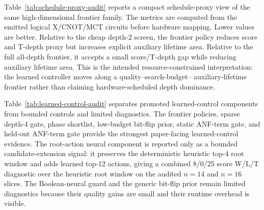 \documentclass[11pt]{article}
\newcommand{\mct}{\ensuremath{\mathrm{MCT}}}
\begin{document}
\begin{table}[H]
\centering
\scriptsize
\caption{Stage-gated depth-frontier controller.  The depth-4 trigger is chosen
on validation data and applied unchanged to scale and truth-bridge rows.}
\label{tab:stage-frontier}

\end{table}

Table~\ref{tab:schedule-proxy-audit} reports a compact schedule-proxy view of
the same high-dimensional frontier family.  The metrics are computed from the
emitted logical X/CNOT/\mct{} circuits before hardware mapping.  Lower values
are better.  Relative to the cheap depth-2 screen, the frontier policy reduces
score and T-depth proxy but increases explicit auxiliary lifetime area.  Relative
to the full all-depth frontier, it accepts a small score/T-depth gap while
reducing auxiliary lifetime area.  This is the intended resource-constrained
interpretation: the learned controller moves along a quality--search-budget--
auxiliary-lifetime frontier rather than claiming hardware-scheduled depth
dominance.

\begin{table}[H]
\centering
\scriptsize
\setlength{\tabcolsep}{2pt}
\renewcommand{\arraystretch}{1.05}
\caption{Logic-level schedule-proxy audit.  Entries show win/loss/tie counts
and mean relative change for the first method versus the second.  The metrics
are backend-relevant logical proxies only; they are not hardware mapping,
routing, or native-gate scheduling results.}
\label{tab:schedule-proxy-audit}

\end{table}

Table~\ref{tab:learned-control-audit} separates promoted learned-control
components from bounded controls and limited diagnostics.  The frontier policies, sparse depth-4
gate, phase shortlist, low-budget bit-flip prior, static ANF-term gate, and
held-out ANF-term gate provide the strongest paper-facing learned-control
evidence.  The root-action
neural component is reported only as a bounded candidate-extension signal: it preserves the
deterministic heuristic top-4 root window and adds learned top-12 actions,
giving a combined 8/0/25 score W/L/T diagnostic over the heuristic root window
on the audited $n=14$ and $n=16$ slices.  The Boolean-neural guard and the
generic bit-flip prior remain limited diagnostics because their quality gains
are small and their runtime overhead is visible.

\begin{table}[H]
\centering
\tiny
\setlength{\tabcolsep}{2pt}
\renewcommand{\arraystretch}{0.96}
\caption{Learned-control evidence audit.  Rows marked as limited are reported
to bound the role of AI rather than promoted as headline improvements.}
\label{tab:learned-control-audit}

\end{table}
\end{document}
